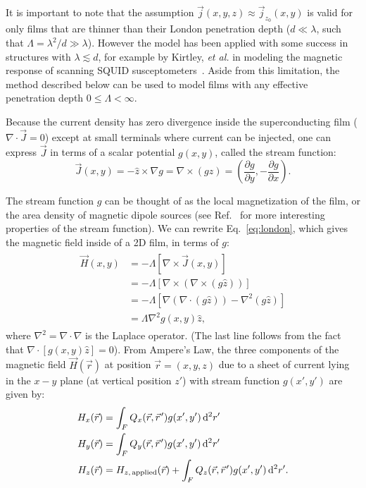 \documentclass[final,3p,times,twocolumn]{elsarticle}
\newcommand{\pvec}[1]{\vec{#1}\mkern2mu\vphantom{#1}}
\newcounter{bla}
\begin{document}
It is important to note that the assumption $\vec{j}(x, y, z)\approx\vec{j}_{z_0}(x, y)$ is valid for only films that are thinner than their London penetration depth ($d\ll\lambda$, such that $\Lambda=\lambda^2/d\gg\lambda$). However the model has been applied with some success in structures with $\lambda\lesssim d$, for example by Kirtley, \emph{et al.} in modeling the magnetic response of scanning SQUID susceptometers~\cite{Kirtley2016-zz,Kirtley2016-gt}. Aside from this limitation, the method described below can be used to model films with any effective penetration depth $0\leq\Lambda<\infty$.

Because the current density has zero divergence inside the superconducting film ($\nabla\cdot\vec{J}=0$)
except at small terminals where current can be injected, one can express $\vec{J}$ in terms
of a scalar potential $g(x, y)$, called the stream function:
\begin{equation}
    \label{eq:stream}
    \vec{J}(x, y) = -\hat{z}\times\nabla g
    = \nabla\times(g\hat{z})
    = \left(\frac{\partial g}{\partial y}, -\frac{\partial g}{\partial x}\right).
\end{equation}

The stream function $g$ can be thought of as the local magnetization of the film, or the area density of magnetic dipole sources (see Ref.~\cite{Brandt2005-wj} for more interesting properties of the stream function). We can rewrite Eq.~\ref{eq:london}, which gives the magnetic field inside of a 2D film, in terms of $g$:
\begin{align}
    \label{eq:london_stream}
    \begin{split}
        \vec{H}(x, y) &= -\Lambda\left[\nabla\times\vec{J}(x, y)\right]\\
        &= -\Lambda\left[\nabla\times\left(\nabla\times(g\hat{z})\right)\right]\\
        &= -\Lambda\left[\nabla(\nabla\cdot(g\hat{z}))-\nabla^2(g\hat{z})\right]\\
        &=\Lambda\nabla^2g(x,y)\hat{z},
    \end{split}
\end{align}
where $\nabla^2=\nabla\cdot\nabla$ is the Laplace operator. (The last line follows from the fact that $\nabla\cdot\left[g(x,y)\hat{z}\right] = 0$). From Ampere's Law, the three components of the magnetic field $\vec{H}(\vec{r})$ at position $\vec{r}=(x, y, z)$ due to a sheet of current lying in the $x-y$ plane (at vertical position $z'$) with stream function $g(x', y')$ are given by:
\begin{align}
    \label{eq:field_from_kernel}
    \begin{split}
        H_x(\vec{r}) &= \int_F Q_x(\vec{r},\pvec{r}')g(x', y')\,\mathrm{d}^2r'\\
        H_y(\vec{r}) &= \int_F Q_y(\vec{r},\pvec{r}')g(x', y')\,\mathrm{d}^2r'\\
        H_z(\vec{r}) &= H_{z,\,\mathrm{applied}}(\vec{r})
        + \int_F Q_z(\vec{r},\pvec{r}')g(x', y')\,\mathrm{d}^2r'.  
    \end{split}
\end{align}
\end{document}
